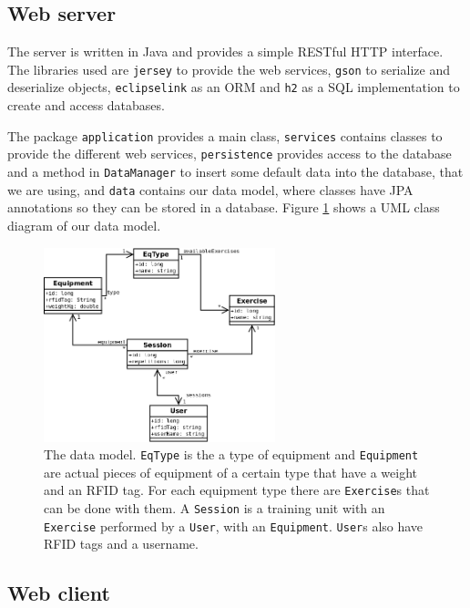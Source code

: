 \documentclass{tk3-team}
\begin{document}
\subsection{Web server}

The server is written in Java and provides a simple RESTful HTTP interface. The libraries used are \texttt{jersey} to provide the web services, \texttt{gson} to serialize and deserialize objects, \texttt{eclipselink} as an ORM and \texttt{h2} as a SQL implementation to create and access databases.

The package \texttt{application} provides a main class, \texttt{services} contains classes to provide the different web services, \texttt{persistence} provides access to the database and a method in \texttt{DataManager} to insert some default data into the database, that we are using, and \texttt{data} contains our data model, where classes have JPA annotations so they can be stored in a database. Figure \ref{fig_data_model} shows a UML class diagram of our data model.

\begin{figure}[!t]
\centering
\includegraphics[width=0.6\textwidth]{img/Ilift_model_uml}
\caption{The data model. \texttt{EqType} is the a type of equipment and \texttt{Equipment} are actual pieces of equipment of a certain type that have a weight and an RFID tag. For each equipment type there are \texttt{Exercise}s that can be done with them. A \texttt{Session} is a training unit with an \texttt{Exercise} performed by a \texttt{User}, with an \texttt{Equipment}. \texttt{User}s also have RFID tags and a username.}
\label{fig_data_model}
\end{figure}

\subsection{Web client}
\end{document}
